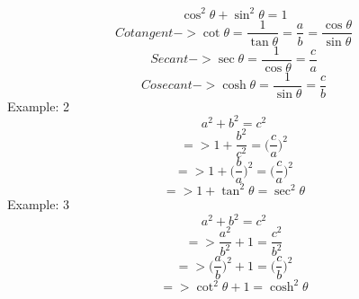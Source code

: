 \begin{equation}
\cos^2\theta+\sin^2\theta = 1
\end{equation}
\newline
\begin{equation}
Cotangent->\cot\theta = \frac{1}{\tan\theta} = \frac{a}{b} = \frac{\cos\theta}{\sin\theta}
\end{equation}
\begin{equation}
Secant->\sec\theta = \frac{1}{\cos\theta} = \frac{c}{a}
\end{equation}
\begin{equation}
Cosecant->\cosh\theta = \frac{1}{\sin\theta}=\frac{c}{b}
\end{equation}
\newline
Example: 2
\begin{equation}
a^2+b^2=c^2
\end{equation}
\begin{displaymath}
=>1+\frac{b^2}{c^2}=\bigg(\frac{c}{a}\bigg)^2
\end{displaymath}
\begin{displaymath}
=> 1+\bigg(\frac{b}{a}\bigg)^2=\bigg(\frac{c}{a}\bigg)^2
\end{displaymath}
\begin{displaymath}
=> 1+\tan^2\theta = \sec^2\theta
\end{displaymath}
\newline
Example: 3
\begin{equation}
a^2+b^2=c^2
\end{equation}
\begin{displaymath}
=>\frac{a^2}{b^2}+1 = \frac{c^2}{b^2}
\end{displaymath}
\begin{displaymath}
=> \bigg(\frac{a}{b}\bigg)^2+1= \bigg(\frac{c}{b}\bigg)^2
\end{displaymath}
\begin{displaymath}
=> \cot^2\theta+1=\cosh^2\theta
\end{displaymath}





